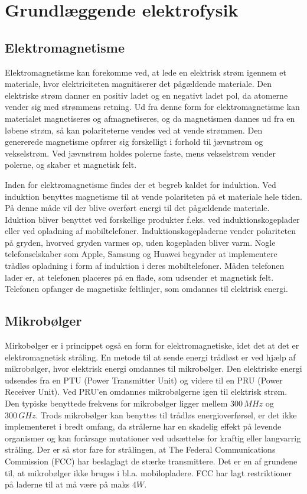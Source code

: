 \section{Grundlæggende elektrofysik}

\subsection{Elektromagnetisme}
Elektromagnetisme kan forekomme ved, at lede en elektrisk strøm igennem et materiale, hvor elektriciteten magnitiserer det pågældende materiale. Den elektriske strøm danner en positiv ladet og en negativt ladet pol, da atomerne vender sig med strømmens retning. Ud fra denne form for elektromagnetisme kan materialet magnetiseres og afmagnetiseres, og da magnetismen dannes ud fra en løbene strøm, så kan polariteterne vendes ved at vende strømmen. Den genererede magnetisme opfører sig forskelligt i forhold til jævnstrøm og vekselstrøm. Ved jævnstrøm holdes polerne faste, mens vekselstrøm vender polerne, og skaber et magnetisk felt.

Inden for elektromagnetisme findes der et begreb kaldet for induktion. Ved induktion benyttes magnetisme til at vende polariteten på et materiale hele tiden. På denne måde vil der blive overført energi til det pågældende materiale. Iduktion bliver benyttet ved forskellige produkter f.eks. ved induktionskogeplader eller ved opladning af mobiltelefoner. Induktionskogepladerne vender polariteten på gryden, hvorved gryden varmes op, uden kogepladen bliver varm. \cite{komfur} Nogle telefonselskaber som Apple, Samsung og Huawei begynder at implementere trådløs opladning i form af induktion i deres mobiltelefoner. \cite{mikro} Måden telefonen lader er, at telefonen placeres på en flade, som udsender et magnetisk felt. Telefonen opfanger de magnetiske feltlinjer, som omdannes til elektrisk energi.\cite{mikro}

\subsection{Mikrobølger}

Mirkobølger er i princippet også en form for elektromagnetiske, idet det at det er elektromagnetisk stråling. En metode til at sende energi trådløst er ved hjælp af mikrobølger, hvor elektrisk energi omdannes til mikrobølger. Den elektriske energi udsendes fra en PTU (Power Transmitter Unit) og videre til en PRU (Power Receiver Unit). Ved PRU'en omdannes mikrobølgerne igen til elektrisk strøm. Den typiske benyttede frekvens for mikrobølger ligger mellem $300 \, MHz$ og $300 \, GHz$. Trods mikrobølger kan benyttes til trådløs energioverførsel, er det ikke implementeret i bredt omfang, da strålerne har en skadelig effekt på levende organismer og kan forårsage mutationer ved udsættelse for kraftig eller langvarrig stråling. Der er så stor fare for strålingen, at The Federal Communications Commission (FCC) har beslaglagt de stærke transmittere. Det er en af grundene til, at mikrobølger ikke bruges i bl.a. mobilopladere. FCC har lagt restriktioner på laderne til at må være på maks $4 W$. \cite{mikro}

\newpage

